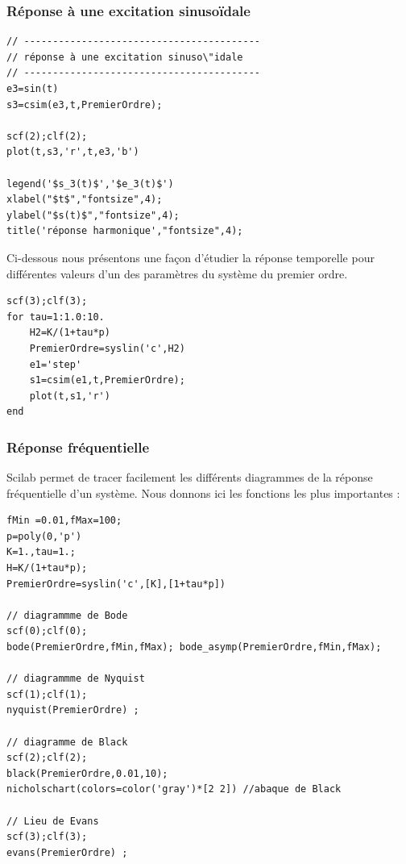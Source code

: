 \subsubsection{Réponse à une excitation sinuso\"idale}
\begin{code}
\begin{verbatim}
// -----------------------------------------
// réponse à une excitation sinuso\"idale 
// -----------------------------------------
e3=sin(t)
s3=csim(e3,t,PremierOrdre);

scf(2);clf(2);
plot(t,s3,'r',t,e3,'b')

legend('$s_3(t)$','$e_3(t)$')
xlabel("$t$","fontsize",4);
ylabel("$s(t)$","fontsize",4); 
title('réponse harmonique',"fontsize",4);
\end{verbatim}
\end{code}

Ci-dessous nous présentons une façon d'étudier la réponse temporelle pour
différentes valeurs d'un des paramètres du système du premier ordre.
\begin{code}
\begin{verbatim}
scf(3);clf(3);
for tau=1:1.0:10.
    H2=K/(1+tau*p)
    PremierOrdre=syslin('c',H2)
    e1='step'
    s1=csim(e1,t,PremierOrdre);
    plot(t,s1,'r')
end
\end{verbatim}
\end{code}


\subsubsection{Réponse fréquentielle}
Scilab permet de tracer facilement les différents diagrammes de la réponse 
fréquentielle d'un système. Nous donnons ici les fonctions les 
plus importantes : 
\begin{code}
\begin{verbatim}
fMin =0.01,fMax=100;
p=poly(0,'p')
K=1.,tau=1.;
H=K/(1+tau*p);
PremierOrdre=syslin('c',[K],[1+tau*p])

// diagrammme de Bode
scf(0);clf(0);
bode(PremierOrdre,fMin,fMax); bode_asymp(PremierOrdre,fMin,fMax);

// diagrammme de Nyquist
scf(1);clf(1);
nyquist(PremierOrdre) ;

// diagramme de Black
scf(2);clf(2);
black(PremierOrdre,0.01,10);
nicholschart(colors=color('gray')*[2 2]) //abaque de Black

// Lieu de Evans
scf(3);clf(3);
evans(PremierOrdre) ;
\end{verbatim}
\end{code}

